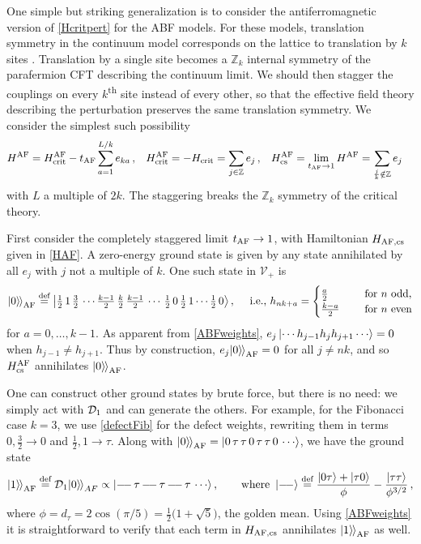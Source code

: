 One simple but striking generalization is to consider the antiferromagnetic version of \eqref{Hcritpert} for the ABF models. 
For these models, translation symmetry in the continuum model corresponds on the lattice to translation by $k$ sites \cite{Huse1984}.
Translation by a single site becomes a $\mathbb{Z}_k$ internal symmetry of the parafermion CFT describing the continuum limit.
We should then stagger the couplings on every $k$\textsuperscript{th} site instead of every other, so that the effective field theory describing the perturbation preserves the same translation symmetry. We consider the simplest such possibility
\begin{align}
	H^{\rm AF} &= H^{\rm AF}_{\rm crit} - t_{\rm AF}\sum_{a=1}^{L/k} e_{ka} \,,
&	H^{\rm AF}_{\rm crit} &= -H_{\rm crit} = \sum_{j\in\mathbb{Z}} e_j \,,
&	H^{\rm AF}_{\rm cs} &= \lim_{t_{\rm AF}\to 1}H^{\rm AF} = \sum_{\frac{j}{k}\notin \mathbb{Z}} e_j
	\label{HAF}
\end{align}
with $L$ a multiple of $2k$. The staggering breaks the $\mathbb{Z}_k$ symmetry of the critical theory.

First consider the completely staggered limit $t_{\rm AF}\to 1$, with Hamiltonian $H_{\rm AF,cs}$ given in \eqref{HAF}. A zero-energy ground state is given by any state annihilated by 
all $e_j$ with $j$ not a multiple of $k$. One such state in $\mathcal{V}_+$ is 
\begin{align}
	{|{0}\rangle\mkern-2mu\rangle}_{\rm AF} \mathrel{\overset{\textrm{def}}{=}} \Ket{ \tfrac12\,1\,\tfrac32\,\cdots \tfrac{k-1}{2}\,\tfrac{k}{2}\, \tfrac{k-1}{2}\,\cdots\,\tfrac12\,0\,\tfrac12\,1\cdots \tfrac12\,0 }, \quad\text{ i.e., }
h_{nk+a}=
\begin{cases}
 \tfrac{a}{2}\quad &\hbox{ for } n \hbox{ odd,}\cr
 \tfrac{k-a}{2}\quad &\hbox{ for } n \hbox{ even}
 \end{cases}
\label{AFgs}
\end{align}
for $a=0,\dots,k-1$.
As apparent from \eqref{ABFweights},  $e_j\ket{\cdots h_{j-1}h_jh_{j+1}\cdots}=0$ when $h_{j-1}\ne h_{j+1}$.
Thus by construction, $e_j {|{0}\rangle\mkern-2mu\rangle}_{\rm AF}=0$ for all  $j\ne nk$, and so $H^{\rm AF}_{\rm cs}$ annihilates ${|{0}\rangle\mkern-2mu\rangle}_{\rm AF}$.

One can construct other ground states by brute force, but there is no need: we simply act with $\mathcal{D}_1$ and can generate the others.
For example, for the Fibonacci case $k=3$, we use  \eqref{defectFib} for the defect weights, rewriting them in terms $0,\frac{3}{2}\to 0$ and $\frac12,1\to \tau$.
Along with ${|{0}\rangle\mkern-2mu\rangle}_{\rm AF} = \ket{0\,\tau\,\tau\,0\,\tau\,\tau\,0\,\cdots}$, we have the ground state
\begin{align}
	{|{1}\rangle\mkern-2mu\rangle}_{\rm AF} \mathrel{\overset{\textrm{def}}{=}} \mathcal{D}_1{|{0}\rangle\mkern-2mu\rangle}_{AF}\propto \ket{ {-\!-} \, \tau \, {-\!-} \, \tau \, {-\!-} \, \tau \, \cdots } ,
	\qquad\text{where } \ket{-\!-} \mathrel{\overset{\textrm{def}}{=}} \frac{ \ket{0\tau} + \ket{\tau0} }{\phi} - \frac{ \ket{\tau\tau} }{\phi^{3/2}} \,,
	\label{AFgs1}
\end{align}
where $\phi=d_\tau=2\cos(\pi/5) = \tfrac{1}{2}\big(1+\sqrt{5}\big)$, the golden mean.
Using \eqref{ABFweights} it is straightforward to verify that each term in $H_{\rm AF,cs}$ annihilates ${|{1}\rangle\mkern-2mu\rangle}_{\rm AF}$ as well.

